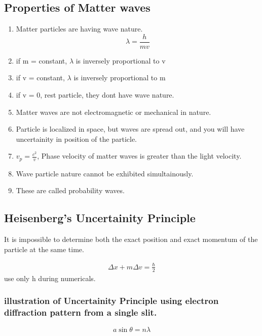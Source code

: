 \documentclass[11pt]{article}
\begin{document}
\subsection{Properties of Matter waves}
\begin{enumerate}
	\item Matter particles are having wave nature. 
	\begin{equation}
		\lambda = \frac{h}{mv}
	\end{equation}	

	\item if m = constant, $\lambda$ is inversely proportional to v
	\item if v = constant, $\lambda$ is inversely proportional to m
	\item if v = 0, rest particle, they dont have wave nature. 
	\item Matter waves are not electromagnetic or mechanical in nature.
	\item Particle is localized in space, but waves are spread out, and you will have uncertainity in position of the particle. 
	\item $v_p = \frac{c^2}{v}$, Phase velocity of matter waves is greater than the light velocity.
	\item Wave particle nature cannot be exhibited simultainously. 
	\item These are called probability waves. 
	
\end{enumerate}

\subsection{Heisenberg's Uncertainity Principle }

It is impossible to determine both the exact position and exact momentum of the particle at the same time. 

\begin{eqnarray}
	\Delta x + m\Delta v =\frac{\hbar}{2}
\end{eqnarray}
use only h during numericals. 
\subsubsection{illustration of Uncertainity Principle using electron diffraction pattern from a single slit. }

\begin{equation}
	a \sin\theta = n\lambda
\end{equation}
\end{document}
